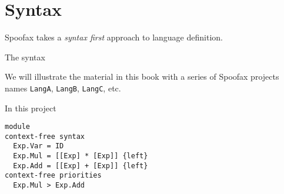 \chapter{Syntax}

Spoofax takes a \emph{syntax first} approach to language definition.

The syntax 

We will illustrate the material in this book with a series of Spoofax
projects names \texttt{LangA}, \texttt{LangB}, \texttt{LangC}, etc. 

In this project 



\begin{verbatim}
module 
context-free syntax
  Exp.Var = ID
  Exp.Mul = [[Exp] * [Exp]] {left}
  Exp.Add = [[Exp] + [Exp]] {left}
context-free priorities
  Exp.Mul > Exp.Add
\end{verbatim}

